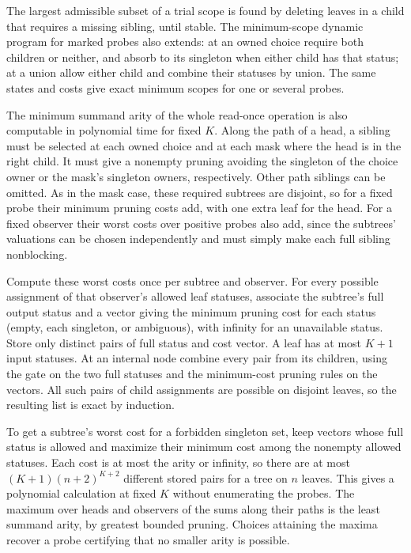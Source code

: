 The largest admissible subset of a trial scope is found
by deleting leaves in a child that requires a missing
sibling, until stable. The minimum-scope dynamic program
for marked probes also extends: at an owned choice require
both children or neither, and absorb to its singleton when
either child has that status; at a union allow either child
and combine their statuses by union. The same states and
costs give exact minimum scopes for one or several probes.

The minimum summand arity of the whole read-once operation
is also computable in polynomial time for fixed $K$. Along
the path of a head, a sibling must be selected at each owned
choice and at each mask where the head is in the right child.
It must give a nonempty pruning avoiding the singleton of
the choice owner or the mask's singleton owners, respectively.
Other path siblings can be omitted. As in the mask case,
these required subtrees are disjoint, so for a fixed probe
their minimum pruning costs add, with one extra leaf for
the head. For a fixed observer their worst costs over
positive probes also add, since the subtrees' valuations
can be chosen independently and must simply make each
full sibling nonblocking.

Compute these worst costs once per subtree and observer.
For every possible assignment of that observer's allowed
leaf statuses, associate the subtree's full output status
and a vector giving the minimum pruning cost for each
status (empty, each singleton, or ambiguous), with infinity
for an unavailable status. Store only distinct pairs of
full status and cost vector. A leaf has at most $K+1$ input
statuses. At an internal node combine every pair from its
children, using the gate on the two full statuses and
the minimum-cost pruning rules on the vectors. All such
pairs of child assignments are possible on disjoint leaves,
so the resulting list is exact by induction.

To get a subtree's worst cost for a forbidden singleton
set, keep vectors whose full status is allowed and maximize
their minimum cost among the nonempty allowed statuses.
Each cost is at most the arity or infinity, so there are
at most $(K+1)(n+2)^{K+2}$ different stored pairs for a
tree on $n$ leaves. This gives a polynomial calculation at
fixed $K$ without enumerating the probes. The maximum
over heads and observers of the sums along their paths
is the least summand arity, by greatest bounded pruning.
Choices attaining the maxima recover a probe certifying
that no smaller arity is possible.


